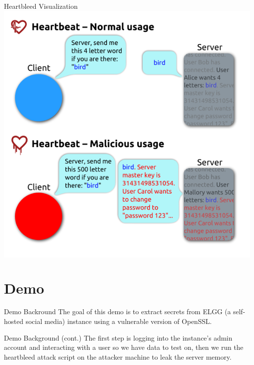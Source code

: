 \documentclass{beamer}
\begin{document}
\begin{frame}{Heartbleed Visualization}
    \includegraphics[width=\textheight]{heartbleed_visualization.png}
\end{frame}

\section{Demo}
\begin{frame}{Demo Backround}
    The goal of this demo is to extract secrets from ELGG (a self-hosted social media)
    instance using a vulnerable version of OpenSSL.

\end{frame}

\begin{frame}{Demo Background (cont.)}
    The first step is logging into the instance's admin account and interacting with a user
    so we have data to test on, then we run the heartbleed
    attack script on the attacker machine to leak the server memory.
\end{frame}
\end{document}
